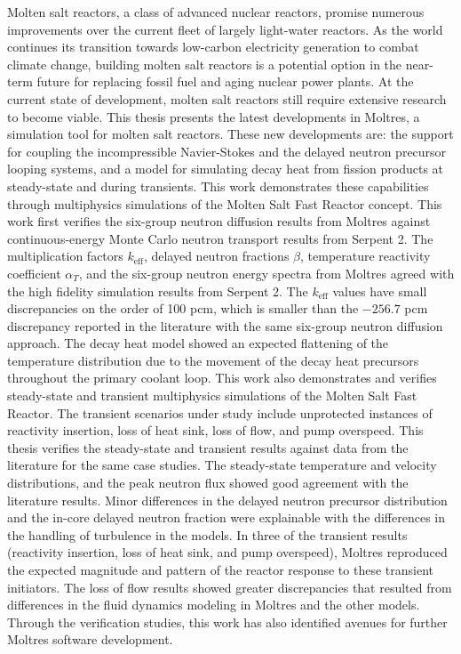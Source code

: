 Molten salt reactors, a class of advanced nuclear reactors, promise
numerous improvements over the current fleet of largely light-water reactors.
As the world continues its transition towards low-carbon electricity
generation to combat climate change, building molten salt reactors is a
potential
option in the near-term future for replacing fossil fuel and aging nuclear
power plants. At the current state of development, molten salt reactors still
require extensive research to become viable. This thesis presents the latest
developments in Moltres, a simulation tool for molten salt reactors. These
new developments are: the support for coupling the incompressible
Navier-Stokes
and the delayed neutron precursor looping systems, and a model for
simulating decay heat from fission products at steady-state and during
transients. This work demonstrates these capabilities through multiphysics
simulations of the Molten Salt Fast
Reactor concept. This work first verifies the six-group neutron diffusion
results from Moltres against continuous-energy Monte Carlo neutron transport
results from Serpent 2. The multiplication factors $k_{\text{eff}}$, delayed
neutron fractions $\beta$, temperature reactivity coefficient $\alpha_T$, and
the six-group neutron energy spectra from Moltres agreed with the high
fidelity simulation results from Serpent 2. The $k_{\text{eff}}$ values have
small discrepancies on the order of 100 pcm, which is smaller than the
$-256.7$ pcm discrepancy reported in the literature with the same six-group
neutron diffusion approach. The decay heat model showed an expected flattening
of the temperature distribution due to the movement of the
decay heat precursors throughout the primary coolant loop. This work also
demonstrates and verifies steady-state and
transient multiphysics simulations of the Molten Salt Fast Reactor. The
transient scenarios under study include unprotected instances of reactivity
insertion, loss of heat sink, loss of flow, and pump overspeed. This thesis
verifies the steady-state and transient results against data from the
literature for the same case studies. The steady-state temperature and
velocity distributions, and the peak neutron flux showed good agreement with
the literature results. Minor differences in the delayed neutron precursor
distribution and the in-core delayed neutron fraction were explainable with
the differences in the handling of turbulence in the models. In three of the
transient results (reactivity insertion, loss of heat sink, and pump
overspeed), Moltres reproduced the expected magnitude and pattern of the
reactor response to these transient initiators.
The loss of flow results showed greater discrepancies that resulted from
differences in the fluid dynamics modeling in Moltres and the other models.
Through the verification studies, this work has also identified avenues
for further Moltres software development.